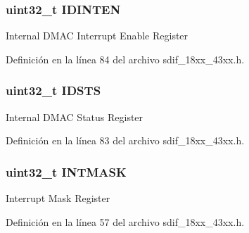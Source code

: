 \subsubsection[{\texorpdfstring{I\+D\+I\+N\+T\+EN}{IDINTEN}}]{ uint32\+\_\+t I\+D\+I\+N\+T\+EN}\hypertarget{struct_l_p_c___s_d_m_m_c___t_a138df0f7066e9b0f1b95cba95dd19d98}{}\label{struct_l_p_c___s_d_m_m_c___t_a138df0f7066e9b0f1b95cba95dd19d98}
Internal D\+M\+AC Interrupt Enable Register 

Definición en la línea 84 del archivo sdif\+\_\+18xx\+\_\+43xx.\+h.

\subsubsection[{\texorpdfstring{I\+D\+S\+TS}{IDSTS}}]{ uint32\+\_\+t I\+D\+S\+TS}\hypertarget{struct_l_p_c___s_d_m_m_c___t_af367e34f9e99c0ab70236918d83e8924}{}\label{struct_l_p_c___s_d_m_m_c___t_af367e34f9e99c0ab70236918d83e8924}
Internal D\+M\+AC Status Register 

Definición en la línea 83 del archivo sdif\+\_\+18xx\+\_\+43xx.\+h.

\subsubsection[{\texorpdfstring{I\+N\+T\+M\+A\+SK}{INTMASK}}]{ uint32\+\_\+t I\+N\+T\+M\+A\+SK}\hypertarget{struct_l_p_c___s_d_m_m_c___t_a1560b04d2a758073f29191927b144529}{}\label{struct_l_p_c___s_d_m_m_c___t_a1560b04d2a758073f29191927b144529}
Interrupt Mask Register 

Definición en la línea 57 del archivo sdif\+\_\+18xx\+\_\+43xx.\+h.

